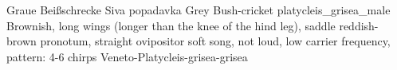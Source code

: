 {Graue Beißschrecke} %
{Siva popadavka} %
{Grey Bush-cricket} %
{platycleis_grisea_male} %
{} %
{Brownish, long wings (longer than the knee of the hind leg), saddle reddish-brown pronotum, straight ovipositor} %
{soft song, not loud, low carrier frequency, pattern: 4-6 chirps} %
{Veneto-Platycleis-grisea-grisea} %